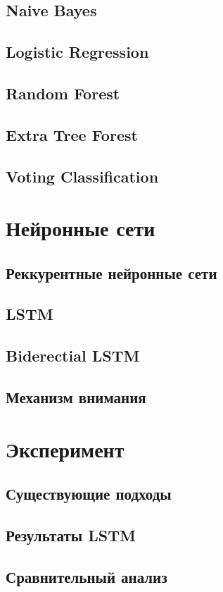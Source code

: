     \subsection{Naive Bayes}
    \subsection{Logistic Regression}
    \subsection{Random Forest}
    \subsection{Extra Tree Forest}
    \subsection{Voting Classification}
\clearpage

\section{Нейронные сети}
    \subsection{Реккурентные нейронные сети}
    \subsection{LSTM}
    \subsection{Biderectial LSTM}
    \subsection{Механизм внимания}
\clearpage

\section{Эксперимент}
    \subsection{Существующие подходы}
    \subsection{Результаты LSTM}
    \subsection{Сравнительный анализ}
\clearpage